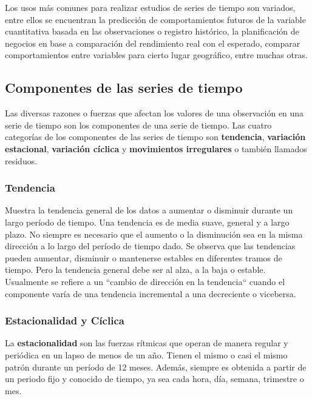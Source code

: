Los usos más comunes para realizar estudios de series de tiempo son variados, entre ellos se encuentran la predicción de comportamientos
futuros de la variable cuantitativa basada en las observaciones o registro histórico, la planificación de negocios en base a comparación del 
rendimiento real con el esperado, comparar comportamientos entre variables para cierto lugar geográfico, entre muchas otras. 


    \subsection{Componentes de las series de tiempo}
    
    Las diversas razones o fuerzas que afectan los valores de una observación en una serie de tiempo son los componentes de una serie de tiempo. 
    Las cuatro categorías de los componentes de las series de tiempo son \textbf{tendencia}, \textbf{variación estacional}, \textbf{variación cíclica} 
    y \textbf{movimientos irregulares} o también llamados residuos.

    \subsubsection{Tendencia}
    Muestra la tendencia general de los datos a aumentar o disminuir durante un largo período de tiempo. Una tendencia es de media suave, general y 
    a largo plazo. No siempre es necesario que el aumento o la disminución sea en la misma dirección a lo largo del período de tiempo dado.
    Se observa que las tendencias pueden aumentar, disminuir o mantenerse estables en diferentes tramos de tiempo. Pero la tendencia general debe ser al alza, a la baja o estable. 
    Usualmente se refiere a un ``cambio de dirección en la tendencia`` cuando el componente varía de una tendencia incremental a una decreciente o vicebersa\cite{20}.

    \subsubsection{Estacionalidad y Cíclica}
    
    La \textbf{estacionalidad} son las fuerzas rítmicas que operan de manera regular y periódica en un lapso de menos de un año. Tienen el mismo o casi el mismo patrón durante un período de 12 meses. 
    Además, siempre es obtenida a partir de un periodo fijo y conocido de tiempo\cite{20}, ya sea cada hora, día, semana, trimestre o mes.
    
